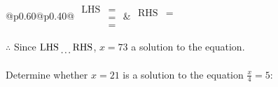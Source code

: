 \documentclass[12pt]{article}
\newcounter{minipagecount}
\begin{document}
\begin{multicols}{2}
\begin{minipage}[t]{0.40\textwidth}
    \noindent
    \renewcommand{\arraystretch}{1.3} %
    \begin{tabular}{@{}p{0.60\linewidth}@{}p{0.40\linewidth}@{}}
        \(\begin{aligned}
            \text{LHS} &=  \\
                    &=  \\
                    &= 
        \end{aligned}\) &
        \(\begin{aligned}
            \text{RHS} &= \\
                    & \\
                    &
        \end{aligned}\)
    \end{tabular}
    \renewcommand{\arraystretch}{1.0} %
    \vspace{2pt}  %

    \noindent \(\therefore\) Since \(\text{LHS} \dotuline{\hspace{5mm}} \text{RHS}\), \(x = 73\) \dotuline{\hspace{12mm}} a solution to the equation.

\end{minipage}

\vspace*{0.5ex}
\vfill{}
\noindent{(\theminipagecount)}\hspace{0.1mm} %
\begin{minipage}[t]{0.40\textwidth} %

    \noindent Determine whether \(x = 21\) is a solution to the equation \(\frac{x}{4} = 5\):
    \vspace{2pt}  %


\end{minipage}
\end{multicols}
\end{document}
